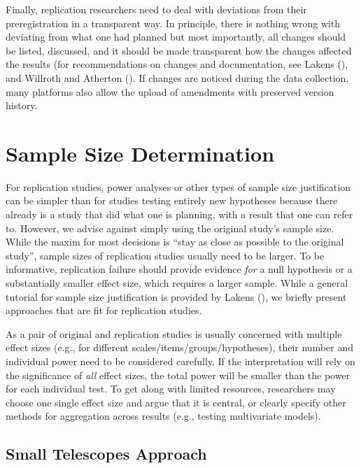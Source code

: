 \documentclass[
  letterpaper,
  DIV=11,
  openany,
  fontsize=12pt,
  parskip=half,
  headings=big,
  numbers=noenddot,
  titlepage=false]{scrreprt}
\begin{document}
Finally, replication researchers need to deal with deviations from their
preregistration in a transparent way. In principle, there is nothing
wrong with deviating from what one had planned but most importantly, all
changes should be listed, discussed, and it should be made transparent
how the changes affected the results (for recommendations on changes and
documentation, see Lakens (), and
Willroth and Atherton (). If
changes are noticed during the data collection, many platforms also
allow the upload of amendments with preserved version history.

\section{Sample Size Determination}\label{sample-size-determination}

For replication studies, power analyses or other types of sample size
justification can be simpler than for studies testing entirely new
hypotheses because there already is a study that did what one is
planning, with a result that one can refer to. However, we advise
against simply using the original study's sample size. While the maxim
for most decisions is ``stay as close as possible to the original
study'', sample sizes of replication studies usually need to be larger.
To be informative, replication failure should provide evidence \emph{for
}a null hypothesis or a substantially smaller effect size, which
requires a larger sample. While a general tutorial for sample size
justification is provided by Lakens (),
we briefly present approaches that are fit for replication studies.

As a pair of original and replication studies is usually concerned with
multiple effect sizes (e.g., for different
scales/items/groups/hypotheses), their number and individual power need
to be considered carefully. If the interpretation will rely on the
significance of \emph{all }effect sizes, the total power will be smaller
than the power for each individual test. To get along with limited
resources, researchers may choose one single effect size and argue that
it is central, or clearly specify other methods for aggregation across
results (e.g., testing multivariate models).

\subsection{Small Telescopes Approach}\label{small-telescopes-approach}
\end{document}
